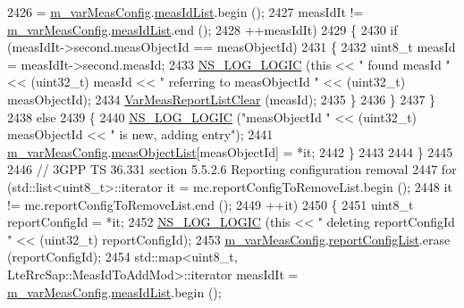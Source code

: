 \begin{DoxyCode}
2426                  = \hyperlink{classns3_1_1LteUeRrc_a27a7773eedfdab964d2514d9eeb1c562}{m\_varMeasConfig}.\hyperlink{structns3_1_1LteUeRrc_1_1VarMeasConfig_aa7ad91f943892cec48ffa9a5ae872e8c}{measIdList}.begin ();
2427                measIdIt != \hyperlink{classns3_1_1LteUeRrc_a27a7773eedfdab964d2514d9eeb1c562}{m\_varMeasConfig}.\hyperlink{structns3_1_1LteUeRrc_1_1VarMeasConfig_aa7ad91f943892cec48ffa9a5ae872e8c}{measIdList}.end ();
2428                ++measIdIt)
2429             \{
2430               \textcolor{keywordflow}{if} (measIdIt->second.measObjectId == measObjectId)
2431                 \{
2432                   uint8\_t measId = measIdIt->second.measId;
2433                   \hyperlink{group__logging_ga88acd260151caf2db9c0fc84997f45ce}{NS\_LOG\_LOGIC} (\textcolor{keyword}{this} << \textcolor{stringliteral}{" found measId "} << (uint32\_t) measId << \textcolor{stringliteral}{" referring to
       measObjectId "} << (uint32\_t)  measObjectId);
2434                   \hyperlink{classns3_1_1LteUeRrc_aa1a5d20a96dec717502ccf0030921f53}{VarMeasReportListClear} (measId);
2435                 \}
2436             \}
2437         \}
2438       \textcolor{keywordflow}{else}
2439         \{
2440           \hyperlink{group__logging_ga88acd260151caf2db9c0fc84997f45ce}{NS\_LOG\_LOGIC} (\textcolor{stringliteral}{"measObjectId "} << (uint32\_t) measObjectId << \textcolor{stringliteral}{" is new, adding entry"});
2441           \hyperlink{classns3_1_1LteUeRrc_a27a7773eedfdab964d2514d9eeb1c562}{m\_varMeasConfig}.\hyperlink{structns3_1_1LteUeRrc_1_1VarMeasConfig_a79928885aabfe13a4d88e5d31233fac3}{measObjectList}[measObjectId] = *it;
2442         \}
2443 
2444     \}
2445 
2446   \textcolor{comment}{// 3GPP TS 36.331 section 5.5.2.6 Reporting configuration removal}
2447   \textcolor{keywordflow}{for} (std::list<uint8\_t>::iterator it = mc.reportConfigToRemoveList.begin ();
2448        it !=  mc.reportConfigToRemoveList.end ();
2449        ++it)
2450     \{
2451       uint8\_t reportConfigId = *it;
2452       \hyperlink{group__logging_ga88acd260151caf2db9c0fc84997f45ce}{NS\_LOG\_LOGIC} (\textcolor{keyword}{this} << \textcolor{stringliteral}{" deleting reportConfigId "} << (uint32\_t)  reportConfigId);
2453       \hyperlink{classns3_1_1LteUeRrc_a27a7773eedfdab964d2514d9eeb1c562}{m\_varMeasConfig}.\hyperlink{structns3_1_1LteUeRrc_1_1VarMeasConfig_a3ebdd65b8ad3393b5e869599e2a0afff}{reportConfigList}.erase (reportConfigId);
2454       std::map<uint8\_t, LteRrcSap::MeasIdToAddMod>::iterator measIdIt = 
      \hyperlink{classns3_1_1LteUeRrc_a27a7773eedfdab964d2514d9eeb1c562}{m\_varMeasConfig}.\hyperlink{structns3_1_1LteUeRrc_1_1VarMeasConfig_aa7ad91f943892cec48ffa9a5ae872e8c}{measIdList}.begin ();

\end{DoxyCode}
